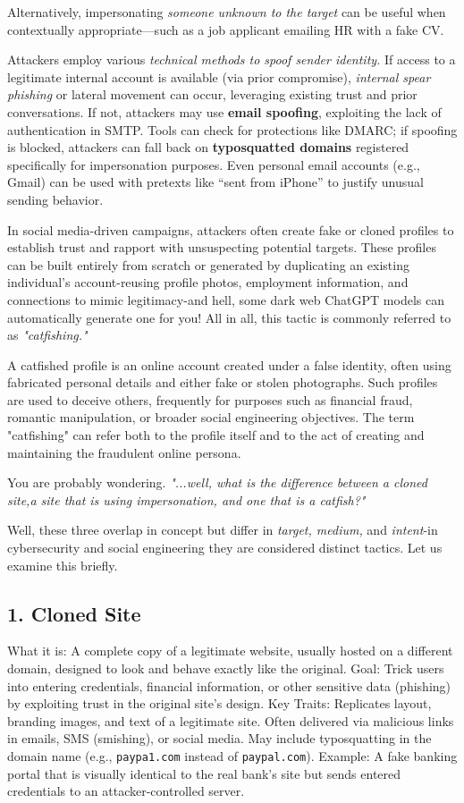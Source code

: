 Alternatively, impersonating \textit{someone unknown to the target} can be useful when contextually appropriate—such as a job applicant emailing HR with a fake CV.

Attackers employ various \textit{technical methods to spoof sender identity. }If access to a legitimate internal account is available (via prior compromise), \textit{internal spear phishing} or lateral movement can occur, leveraging existing trust and prior conversations. If not, attackers may use \textbf{email spoofing}, exploiting the lack of authentication in SMTP. Tools can check for protections like DMARC; if spoofing is blocked, attackers can fall back on \textbf{typosquatted domains} registered specifically for impersonation purposes. Even personal email accounts (e.g., Gmail) can be used with pretexts like “sent from iPhone” to justify unusual sending behavior.

In social media-driven campaigns, attackers often create fake or cloned profiles to establish trust and rapport with unsuspecting potential targets. These profiles can be built entirely from scratch or generated by duplicating an existing individual's account-reusing profile photos, employment information, and connections to mimic legitimacy-and hell, some dark web ChatGPT models can automatically generate one for you! All in all, this tactic is commonly referred to as \textit{"catfishing."}

A catfished profile is an online account created under a false identity, often using fabricated personal details and either fake or stolen photographs. Such profiles are used to deceive others, frequently for purposes such as financial fraud, romantic manipulation, or broader social engineering objectives. The term "catfishing" can refer both to the profile itself and to the act of creating and maintaining the fraudulent online persona.

You are probably wondering. \textit{"...well, what is the difference between a cloned site,a site that is using impersonation, and one that is a catfish?"}

Well, these three overlap in concept but differ in \textit{target, medium,} and \textit{intent}-in cybersecurity and social engineering they are considered distinct tactics. Let us examine this briefly.

\subsection{1. Cloned Site}
What it is:
A complete copy of a legitimate website, usually hosted on a different domain, designed to look and behave exactly like the original.
Goal:
Trick users into entering credentials, financial information, or other sensitive data (phishing) by exploiting trust in the original site's design.
Key Traits:
Replicates layout, branding images, and text of a legitimate site.
Often delivered via malicious links in emails, SMS (smishing), or social media.
May include typosquatting in the domain name (e.g., \texttt{paypa1.com} instead of \texttt{paypal.com}).
Example:
A fake banking portal that is visually identical to the real bank's site but sends entered credentials to an attacker-controlled server.


